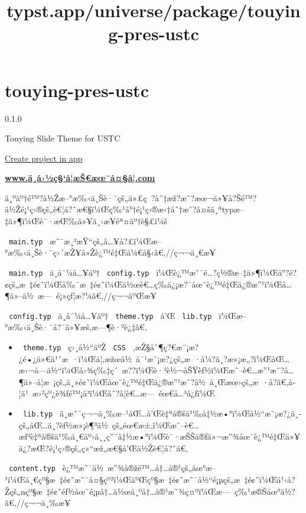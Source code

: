 \title{typst.app/universe/package/touying-pres-ustc}

\label{banner}
\label{template-thumbnail}

\section{touying-pres-ustc}\label{touying-pres-ustc}

{ 0.1.0 }

Touying Slide Theme for USTC

\href{/app?template=touying-pres-ustc&version=0.1.0}{Create project in
app}

\label{readme}
\textbf{\href{http://www.xn--fiqs8srwby7cba020i2hih02b.com/}{www.ä¸­å›½ç§`å­¦æŠ€æœ¯å¤§å­¦.com}}

ä¸ºäº†é™?ä½Žæ--°æ‰‹ä¸Šè·¯çš„ä»£ç~?åˆ†æž?æˆ?æœ¬ä»¥å?Šé™?ä½Žé¡¹ç›®çš„è€¦å?ˆæ€§ï¼Œç‰¹å°†é¡¹ç›®æ‹†åˆ†æˆ?å¤šä¸ªtypæ--‡ä»¶ï¼Œè¯·æŒ‰ä»¥ä¸‹æ­¥éª¤äº†è§£ï¼š

\texttt{\ main.typ\ }
æ˜¯æ¸²æŸ``çš„å\ldots¥å?£ï¼Œæ--°æ‰‹ä¸Šè·¯ç›´æŽ¥ä»Žè¿™é‡Œå¼€å§‹ã€‚//ç¬¬ä¸€æ­¥

\texttt{\ main.typ\ } ä¸­å¯¼å\ldots¥äº† \texttt{\ config.typ\ }
ï¼Œè¿™æ˜¯é\ldots?ç½®æ--‡ä»¶ï¼Œå°?é?¢çš„æ~‡é¢˜ï¼Œå‰¯æ~‡é¢˜ï¼Œä½œè€\ldots ç­‰ä¿¡æ?¯åœ¨è¿™é‡Œä¿®æ''¹ï¼Œå\ldots¶ä»--ä½~æ---~é¡»çƒ¦æ?¼ã€‚//ç¬¬äºŒæ­¥

\texttt{\ config.typ\ } ä¸­å¯¼å\ldots¥äº† \texttt{\ theme.typ\ } å'Œ
\texttt{\ lib.typ\ } ï¼Œæ--°æ‰‹ä¸Šè·¯å?¯ä»¥æš‚æ---¶è·³è¿‡ã€‚

\begin{itemize}
\tightlist
\item
  \texttt{\ theme.typ\ } ç›¸å½``äºŽ \texttt{\ CSS\ }
  ,æŽ§åˆ¶ç?€æ¨¡æ?¿é•¿ä»€ä¹ˆæ~·ï¼Œå¦‚æžœä½~å¯¹æ¨¡æ?¿çš„æ~·å¼?ä¸?æ»¡æ„?ï¼ŒåŒ\ldots æ‹¬å­---ä½``ï¼Œå›¾ç‰‡ç´~æ??ï¼Œè·³è½¬åŠŸèƒ½ï¼Œæˆ--è€\ldots æ''¹æˆ?å\ldots¶ä»--å­¦æ~¡çš„ä¸»é¢˜ï¼Œåœ¨è¿™é‡Œä¿®æ''¹æˆ?ä½~å¸Œæœ›çš„æ~·å­?ã€‚å­¦ä¹~æ›²çº¿è¾ƒé™¡å³­ï¼Œåˆ?å­¦è€\ldots æ---~éœ€å\ldots³å¿ƒï¼Œ
\item
  \texttt{\ lib.typ\ }
  ä¸­æ˜¯ç¬¬ä¸‰æ--¹åŒ\ldots å'Œè‡ªå®šä¹‰å‡½æ•°ï¼Œå½``æ¨¡æ?¿ä¸­çš„åŒ\ldots ä¸?èƒ½æ»¡è¶³ä½~çš„éœ€æ±‚ï¼Œæˆ--è€\ldots æƒ³è‡ªå®šä¹‰ä¸€äº›å¸¸ç''¨å‡½æ•°ï¼Œè¯·æŠŠå®ƒä»¬æ''¾åœ¨è¿™é‡Œä»¥ä¿?æŒ?é¡¹ç›®çš„ç»``æž„æ€§å'Œä½Žè€¦å?ˆã€‚
\end{itemize}

\texttt{\ content.typ\ }
è¿™æ˜¯ä½~æ''¾å®žé™\ldots å†\ldots å®¹çš„åœ°æ--¹ï¼Œä¸€çº§æ~‡é¢˜æ˜¯å¤§çº²ï¼ŒäºŒçº§æ~‡é¢˜æ˜¯å½``é¡µçš„æ~‡é¢˜ï¼Œä¹‹å?Žçš„nçº§æ~‡é¢˜éƒ½åœ¨é¡µå†\ldots ä½œä¸ºå†\ldots å®¹æ˜¾ç¤ºï¼Œæ---~ç‰¹æ®Šåœ°ä½?ã€‚//ç¬¬ä¸‰æ­¥

